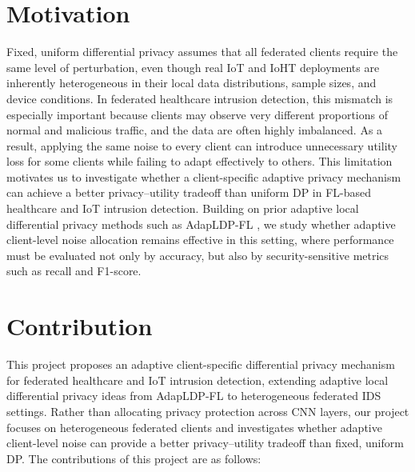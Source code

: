 \documentclass[letterpaper]{article}
\begin{document}
\pagebreak

\section{Motivation}
Fixed, uniform differential privacy assumes that all federated clients require the same level of perturbation, even though real IoT and IoHT deployments are inherently heterogeneous in their local data distributions, sample sizes, and device conditions. In federated healthcare intrusion detection, this mismatch is especially important because clients may observe very different proportions of normal and malicious traffic, and the data are often highly imbalanced. As a result, applying the same noise to every client can introduce unnecessary utility loss for some clients while failing to adapt effectively to others. This limitation motivates us to investigate whether a client-specific adaptive privacy mechanism can achieve a better privacy--utility tradeoff than uniform DP in FL-based healthcare and IoT intrusion detection. Building on prior adaptive local differential privacy methods such as AdapLDP-FL \cite{yue2025adapldpfl}, we study whether adaptive client-level noise allocation remains effective in this setting, where performance must be evaluated not only by accuracy, but also by security-sensitive metrics such as recall and F1-score.

\section{Contribution}
This project proposes an adaptive client-specific differential privacy mechanism for federated healthcare and IoT intrusion detection, extending adaptive local differential privacy ideas from AdapLDP-FL \cite{yue2025adapldpfl} to heterogeneous federated IDS settings. Rather than allocating privacy protection across CNN layers, our project focuses on heterogeneous federated clients and investigates whether adaptive client-level noise can provide a better privacy--utility tradeoff than fixed, uniform DP. The contributions of this project are as follows:
\end{document}
